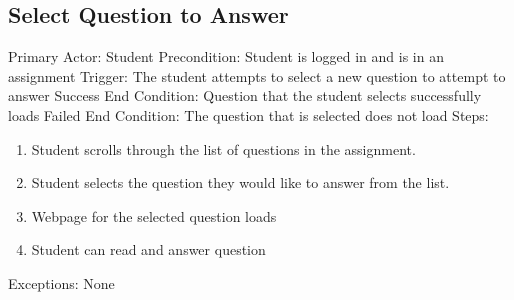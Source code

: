     \subsection{Select Question to Answer}
        Primary Actor: Student \newline
        Precondition: Student is logged in and is in an assignment         \newline
        Trigger: The student attempts to select a new question      to attempt to answer \newline
        Success End Condition: Question that the student selects     successfully loads \newline
        Failed End Condition: The question that is selected does     not load \newline
        \newline
        Steps:
        \begin{enumerate}
            \item{Student scrolls through the list of questions in the assignment.}
            \item{Student selects the question they would like to        answer from the list.}
            \item{Webpage for the selected question loads}
            \item{Student can read and answer question}
        \end{enumerate}
        Exceptions: None



